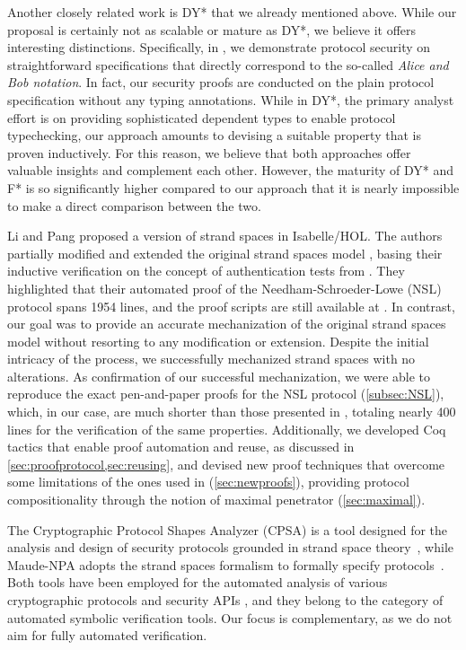 Another closely related work is DY* \cite{DY} that we already mentioned above.
While our proposal is certainly not as scalable or mature as DY*, we believe it offers interesting distinctions. Specifically, in \easystrands, we demonstrate protocol security on straightforward specifications that directly correspond to the so-called \emph{Alice and Bob notation}.
In fact, our
security proofs are conducted on the plain protocol specification without any typing annotations.
While in DY*, the primary analyst effort is on providing sophisticated dependent types to enable protocol typechecking, our approach amounts to devising a suitable property that is proven inductively.
For this reason, we believe that both approaches offer valuable insights and complement each other. However, the maturity of DY* and F* is so significantly higher compared to our approach that it is nearly impossible to make a direct comparison between the two.



Li and Pang \cite{li2013inductive} proposed a version of strand spaces in Isabelle/HOL.
The authors partially modified and extended the original strand spaces model \cite{FHG98}, basing their inductive verification on the concept of authentication tests from \cite{guttman2000authentication}.
They highlighted that their automated proof of the Needham-Schroeder-Lowe (NSL) protocol spans 1954 lines, and the proof scripts are still available at \cite{Yongjianstrands}.
In contrast, our goal was to provide an accurate mechanization of the original strand spaces model without resorting to any modification or extension. Despite the initial intricacy of the process, we successfully mechanized strand spaces with no alterations. As confirmation of our successful mechanization, we were able to reproduce the exact pen-and-paper proofs for the NSL protocol (\cref{subsec:NSL}), which, in our case, are much shorter than those presented in \cite{li2013inductive}, totaling nearly 400 lines for the verification of the same properties. Additionally, we developed Coq tactics that enable proof automation and reuse, as discussed in \cref{sec:proofprotocol,sec:reusing}, and
devised new proof techniques that overcome some limitations of the ones used in \cite{FHG98} (\cref{sec:newproofs}), providing protocol compositionality through the notion of maximal penetrator (\cref{sec:maximal}).

The Cryptographic Protocol Shapes Analyzer (CPSA) is a tool designed for the analysis and design of security protocols grounded in strand space theory~\cite{cpsa,LRGR16}, while Maude-NPA adopts the strand spaces formalism to formally specify protocols~\cite{EMM09}.
Both tools have been employed for the automated analysis of various cryptographic protocols and security APIs \cite{MaudeAPI1,MaudeAPI2,J12,LZ17,RGMO12,RDGR18,SRP20}, and they belong to the category of automated symbolic verification tools. Our focus is complementary, as we do not aim for fully automated verification.

